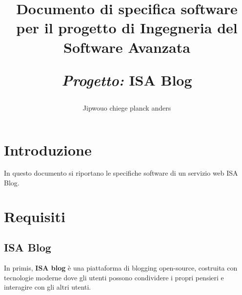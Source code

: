 \documentclass{article}
\title{Documento di specifica software per il progetto di Ingegneria del Software Avanzata\par
\textit{Progetto:} \textbf{ISA Blog}\\}
\author{Jipwouo chiege planck anders}
\date{}
\begin{document}
    \maketitle
    \clearpage

    \tableofcontents
    \clearpage

    \section{Introduzione}
    \label{sec:introduzione}

    In questo documento si riportano le specifiche software di un servizio web ISA Blog.

    \section{Requisiti}
    \label{sec:requisiti}

    \subsection{ISA Blog}

    In primis, \textbf{ISA blog} è una piattaforma di blogging open-source, costruita con tecnologie moderne
    dove gli utenti possono condividere i propri pensieri e interagire con gli altri utenti.\\
\end{document}
